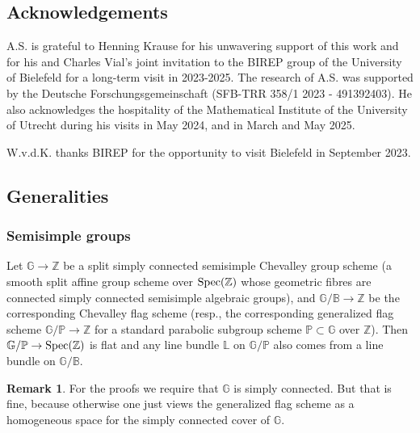 \documentclass[sn-mathphys-num]{sn-jnl}%
\newcommand{\Gm}{\mathbb G}
\newcommand{\Pp}{\mathbb P}
\newcommand{\Z}{{\mathbb Z}}
\theoremstyle{definition}
\newtheorem{remark}[theorem]{Remark}
\begin{document}
\subsection*{Acknowledgements}
A.S. is grateful to Henning Krause for his unwavering support of this work and for his and Charles Vial's joint invitation to the BIREP group of the University of Bielefeld for a long-term visit in 2023-2025. 
The research of A.S. was supported by the Deutsche Forschungsgemeinschaft (SFB-TRR 358/1 2023 - 491392403). He also acknowledges the hospitality of the Mathematical Institute of the University of Utrecht during his visits in May 2024, and in March and May 2025. 

W.v.d.K. thanks BIREP for the opportunity to visit Bielefeld in September 2023.

\subsection{Generalities}\label{subsec:Notation}

\subsubsection{Semisimple groups}\label{subsec:reductive}
Let ${\mathbb G}\rightarrow \mathbb Z$ be a split simply connected semisimple Chevalley group scheme (a smooth split affine group scheme over ${\rm Spec}(\mathbb Z)$ whose geometric fibres are connected simply connected
semisimple algebraic groups), and ${\mathbb G}/{\mathbb B}\rightarrow \mathbb Z$ be the corresponding Chevalley flag scheme (resp., 
the corresponding
generalized flag scheme ${\Gm}/{  \Pp}\rightarrow \Z$ for a standard parabolic subgroup scheme ${\mathbb P}\subset \mathbb G$ over ${\mathbb Z}$). 
Then ${\mathbb G/\mathbb P}\rightarrow {\rm Spec}({\mathbb Z})$ is flat and any line bundle $\mathbb L$ on ${\Gm/  \Pp}$ also comes from a line bundle  on ${\mathbb G/\mathbb B}$. 

\begin{remark}
    For the proofs we require that ${\mathbb G}$ is simply connected.
    But that is fine, because otherwise one just views the generalized flag scheme as a homogeneous space for the simply connected cover of ${\mathbb G}$.
\end{remark}
\end{document}
